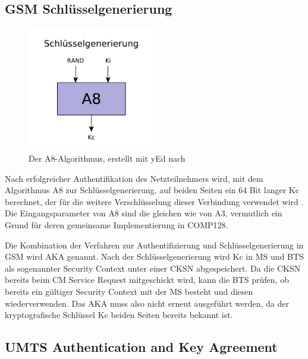 \subsection{GSM Schlüsselgenerierung} \label{hdl:keygen}

\begin{figure}[H]
  \begin{center}
    \includegraphics[width=0.5\textwidth]{figures/gsm_a8.pdf}
  \end{center}
  \caption[Der A8-Algorithmus]{Der \ac{A8}-Algorithmus, erstellt mit yEd nach } \label{fig:a8-algorithm}
\end{figure}

Nach erfolgreicher Authentifikation des Netzteilnehmers wird, mit dem Algorithmus \ac{A8} zur Schlüsselgenerierung, auf beiden Seiten ein 64 Bit langer \ac{Kc} berechnet, der für die weitere Verschlüsselung dieser Verbindung verwendet wird . Die Eingangsparameter von \ac{A8} sind die gleichen wie von \ac{A3}, vermutlich ein Grund für deren gemeinsame Implementierung in \ac{COMP128}.

Die Kombination der Verfahren zur Authentifizierung und Schlüsselgenerierung in \ac{GSM} wird \ac{AKA} genannt. Nach der Schlüsselgenerierung wird \ac{Kc} in \ac{MS} und \ac{BTS} als sogenannter Security Context unter einer \ac{CKSN} abgespeichert. Da die \ac{CKSN} bereits beim CM Service Request mitgeschickt wird, kann die \ac{BTS} prüfen, ob bereits ein gültiger Security Context mit der \ac{MS} besteht und diesen wiederverwenden. Das \ac{AKA} muss also nicht erneut ausgeführt werden, da der kryptografische Schlüssel \ac{Kc} beiden Seiten bereits bekannt ist. 

\subsection{UMTS Authentication and Key Agreement} \label{hdl:umts-aka}

